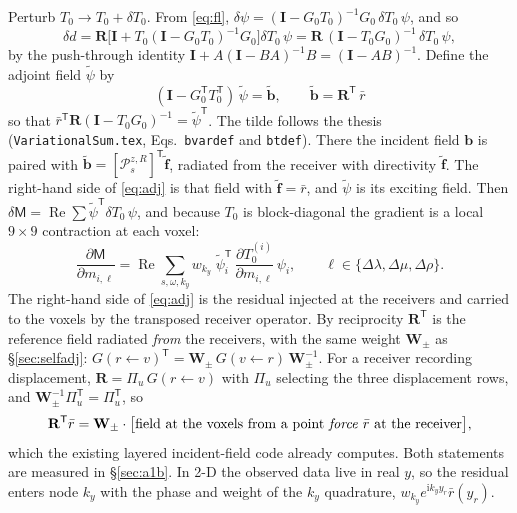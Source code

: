 \documentclass[11pt,a4paper]{article}
\newcommand{\ii}{\mathrm{i}}
\newcommand{\Tz}{T_0}
\newcommand{\Gz}{G_0}
\newcommand{\bR}{\mathbf{R}}
\newcommand{\bI}{\mathbf{I}}
\newcommand{\T}{\mathsf{T}}
\begin{document}
Perturb $\Tz\to\Tz+\delta\Tz$. From \eqref{eq:fl},
$\delta\psi = (\bI-\Gz\Tz)^{-1}\Gz\,\delta\Tz\,\psi$, and so
\begin{equation}
  \delta d = \bR\bigl[\bI + \Tz(\bI-\Gz\Tz)^{-1}\Gz\bigr]\delta\Tz\,\psi
           = \bR\,(\bI-\Tz\Gz)^{-1}\,\delta\Tz\,\psi ,
\end{equation}
by the push-through identity $\bI + A(\bI-BA)^{-1}B = (\bI-AB)^{-1}$. Define the adjoint field
$\tilde\psi$ by
\begin{equation}\label{eq:adj}
  \boxed{\;(\bI - \Gz^{\T}\Tz^{\T})\,\tilde\psi = \tilde{\mathbf b},\qquad \tilde{\mathbf b} = \bR^{\T}\,\bar r\;}
\end{equation}
so that $\bar r^{\T}\bR(\bI-\Tz\Gz)^{-1} = \tilde\psi^{\T}$. The tilde follows the thesis
(\texttt{VariationalSum.tex}, Eqs.~\texttt{bvardef} and \texttt{btdef}). There the incident field
$\mathbf{b}$ is paired with $\tilde{\mathbf{b}} = [\mathcal{P}^{z,R}_{s}]^{\T}\tilde{\mathbf{f}}$,
radiated from the receiver with directivity $\tilde{\mathbf{f}}$. The right-hand side of
\eqref{eq:adj} is that field with $\tilde{\mathbf{f}} = \bar r$, and $\tilde\psi$ is its exciting
field. Then
$\delta\mathsf{M} = \operatorname{Re}\sum \tilde\psi^{\T}\delta\Tz\,\psi$, and because $\Tz$ is block-diagonal
the gradient is a local $9\times9$ contraction at each voxel:
\begin{equation}\label{eq:grad}
  \boxed{\;
  \frac{\partial\mathsf{M}}{\partial m_{i,\ell}}
  = \operatorname{Re}\sum_{s,\omega,k_y} w_{k_y}\;
    \tilde\psi_i^{\T}\,\frac{\partial\Tz^{(i)}}{\partial m_{i,\ell}}\,\psi_i ,
  \qquad \ell\in\{\Delta\lambda,\Delta\mu,\Delta\rho\}. \;}
\end{equation}
The right-hand side of \eqref{eq:adj} is the residual injected at the receivers and carried to the
voxels by the transposed receiver operator. By reciprocity $\bR^{\T}$ is the reference field
radiated \emph{from} the receivers, with the same weight $\mathbf{W}_{\pm}$ as \S\ref{sec:selfadj}:
$G(r\!\leftarrow\!v)^{\T} = \mathbf{W}_{\pm}\,G(v\!\leftarrow\!r)\,\mathbf{W}_{\pm}^{-1}$. For a receiver
recording displacement, $\bR = \Pi_u\,G(r\!\leftarrow\!v)$ with $\Pi_u$ selecting the three displacement
rows, and $\mathbf{W}_{\pm}^{-1}\Pi_u^{\T} = \Pi_u^{\T}$, so
\begin{equation}\label{eq:rt}
  \bR^{\T}\bar r = \mathbf{W}_{\pm}\cdot\bigl[\text{field at the voxels from a point \emph{force}
  $\bar r$ at the receiver}\bigr],
\end{equation}
which the existing layered incident-field code already computes. Both statements are measured in
\S\ref{sec:a1b}. In 2\textonehalf-D
the observed data live in real $y$, so the residual enters node $k_y$ with the phase and weight
of the $k_y$ quadrature, $w_{k_y}e^{\ii k_y y_r}\bar r(y_r)$.
\end{document}
